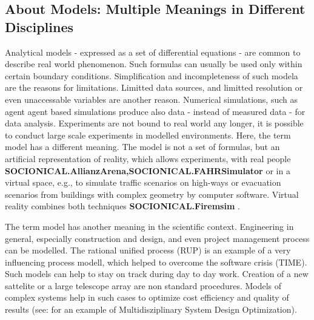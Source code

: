 \documentclass[a4paper,10pt]{scrbook}
\begin{document}
\subsection{About Models: Multiple Meanings in Different Disciplines}
Analytical models - expressed as a set of differential equations - are common to describe real world phenomenon. Such formulas can usually be used only within certain boundary conditions. Simplification and incompleteness of such modela are the reasons for limitations. Limitted data sources, and limitted resolution or even unaccessable variables are another reason. Numerical simulations, such as agent agent based simulations produce also data - instead of measured data - for data analysis. Experiments are not bound to real world any longer, it is possible to conduct large scale experiments in modelled environments. Here, the term model has a different meaning. The model is not a set of formulas, but an artificial representation of reality, which allows experiments, with real people \textbf{SOCIONICAL.AllianzArena,SOCIONICAL.FAHRSimulator} \cite{SOCIONICAL.AllianzArena,SOCIONICAL.FAHRSimulator} or in a virtual space, e.g., to simulate traffic scenarios on high-ways \cite{Kantelhardt2013phases} or evacuation scenarios from buildings with complex geometry \cite{Gawronski2011evacuation} by computer software. Virtual reality combines both techniques \textbf{SOCIONICAL.Firemsim} \cite{SOCIONICAL.Firemsim}.   

The term model has another meaning in the scientific context. Engineering in general, especially construction and design, and even project management process can be modelled. The rational unified process (RUP) \cite{IBM.RUP} is an example of a very influencing process modell, which helped to overcome the software crisis (TIME). Such models can help to stay on track during day to day work. Creation of a new sattelite or a large telescope array are non standard procedures. Models of complex systems help in such cases to optimize cost efficiency and quality of results (see: \cite{Bunova2005} for an example of Multidisziplinary System Design Optimization). 
\end{document}
